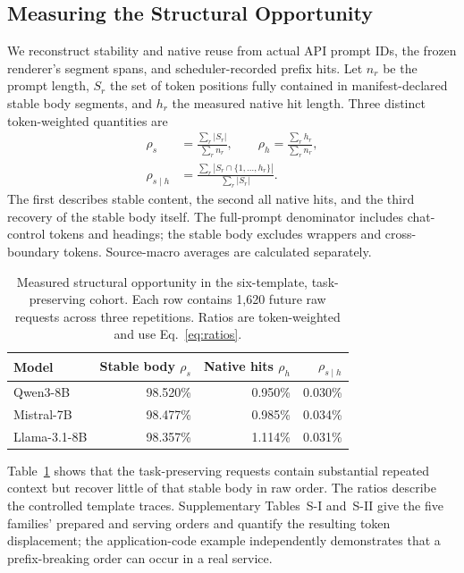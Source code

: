\subsection{Measuring the Structural Opportunity}
We reconstruct stability and native reuse from actual API prompt IDs, the frozen renderer's segment spans, and scheduler-recorded prefix hits. Let $n_r$ be the prompt length, $S_r$ the set of token positions fully contained in manifest-declared stable body segments, and $h_r$ the measured native hit length. Three distinct token-weighted quantities are
\begin{equation}
\begin{aligned}
 \rho_s&=\frac{\sum_r |S_r|}{\sum_r n_r},\qquad
 \rho_h=\frac{\sum_r h_r}{\sum_r n_r},\\
 \rho_{s\mid h}&=\frac{\sum_r|S_r\cap\{1,\ldots,h_r\}|}{\sum_r|S_r|}.
\end{aligned}
\label{eq:ratios}
\end{equation}
The first describes stable content, the second all native hits, and the third recovery of the stable body itself. The full-prompt denominator includes chat-control tokens and headings; the stable body excludes wrappers and cross-boundary tokens. Source-macro averages are calculated separately.

\begin{table}[t]
\centering\small
\caption{Measured structural opportunity in the six-template, task-preserving cohort. Each row contains 1,620 future raw requests across three repetitions. Ratios are token-weighted and use Eq.~\eqref{eq:ratios}.}
\label{tab:motivation}
\begin{tabular}{@{}lrrr@{}}
\toprule
Model & Stable body $\rho_s$ & Native hits $\rho_h$ & $\rho_{s\mid h}$\\
\midrule
Qwen3-8B & 98.520\% & 0.950\% & 0.030\%\\
Mistral-7B & 98.477\% & 0.985\% & 0.034\%\\
Llama-3.1-8B & 98.357\% & 1.114\% & 0.031\%\\
\bottomrule
\end{tabular}
\end{table}

Table~\ref{tab:motivation} shows that the task-preserving requests contain substantial repeated context but recover little of that stable body in raw order. The ratios describe the controlled template traces. Supplementary Tables~S-I and~S-II give the five families' prepared and serving orders and quantify the resulting token displacement; the application-code example independently demonstrates that a prefix-breaking order can occur in a real service.

